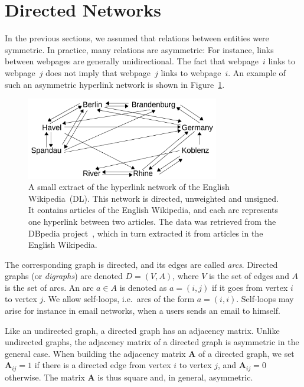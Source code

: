 \documentclass[11pt,a4paper]{book}
\newcommand{\wOnePointFive}{0.75}
\begin{document}
\section{Directed Networks}
\label{sec:asymmetry:directed}
In the previous sections, we assumed that relations between entities
were symmetric.  In practice, many relations are asymmetric:  
For instance, links between webpages are generally unidirectional.  The fact that
webpage~$i$ links to webpage~$j$ does not imply that webpage~$j$ links to
webpage~$i$. 
An example of such an asymmetric hyperlink network is shown in Figure~\ref{fig:wikilinks}.

\begin{figure}[h!]
  \centering
  \includegraphics[width=\wOnePointFive\textwidth]{img-pdf/wikilinks}
  \caption{
    A small extract of the hyperlink network of the English
    Wikipedia~(\textsf{DL}). 
    This network is directed, unweighted and unsigned.
    It contains articles of the English Wikipedia, and each arc
    represents one hyperlink between two articles. 
    The data was retrieved from the DBpedia project~\cite{b642}, which in
    turn extracted it from articles in the English
    Wikipedia. 
  }
  \label{fig:wikilinks}
\end{figure}

The corresponding graph is directed, and its edges are called
\emph{arcs}.  Directed graphs (or \emph{digraphs}) are denoted
$D=(V,A)$, where $V$ 
is the set of edges and $A$ is the set of arcs.  An arc $a \in A$ is
denoted as $a = (i,j)$ if it goes from vertex $i$ to vertex $j$. 
We allow self-loops, i.e.\ arcs of the form $a
= (i,i)$. Self-loops may arise for instance in email networks, when a
users sends an email to himself. 

Like an undirected graph, a directed graph has an adjacency matrix.  Unlike
undirected graphs, the adjacency matrix of a directed graph is
asymmetric in the general case. 
When building the adjacency matrix $\mathbf A$ of a directed graph, we
set $\mathbf A_{ij}=1$ if there is a directed edge from vertex
$i$ to vertex $j$, and $\mathbf A_{ij} = 0$ otherwise.  The matrix $\mathbf
A$ is thus square and, in general, asymmetric.
\end{document}
